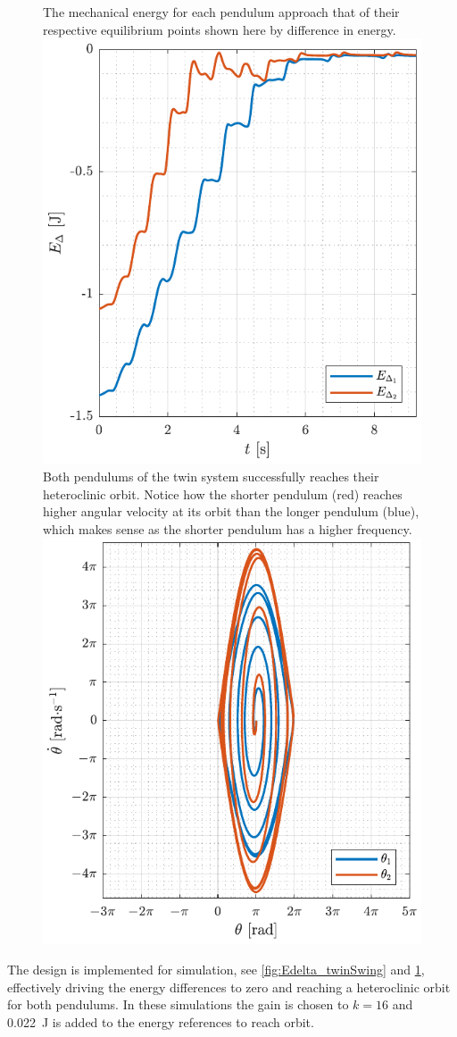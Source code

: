 \begin{figure}[H]
  \hspace{-10pt}
  \captionbox 
  {
    The mechanical energy for each pendulum approach that of their respective equilibrium points shown here by difference in energy.
    \label{fig:Edelta_twinSwing}
  }
  {
    \hspace{-1cm}
    \includegraphics[width=.448\textwidth]{figures/Edelta_twinSwing}
  }
  \hspace{20pt}
  \captionbox 
  {
    Both pendulums of the twin system successfully reaches their heteroclinic orbit. Notice how the shorter pendulum (red) reaches higher angular velocity at its orbit than the longer pendulum (blue), which makes sense as the shorter pendulum has a higher frequency.
    \label{fig:phase_twinSwing}
  }
  {
    \hspace{-1cm}
    \includegraphics[width=.46\textwidth]{figures/phase_twinSwing}
  }
\end{figure}
%
The design is implemented for simulation, see \autoref{fig:Edelta_twinSwing} and \ref{fig:phase_twinSwing}, effectively driving the energy differences to zero and reaching a heteroclinic orbit for both pendulums. In these simulations the gain is chosen to $k=16$ and \SI{.022}{J} is added to the energy references to reach orbit.
